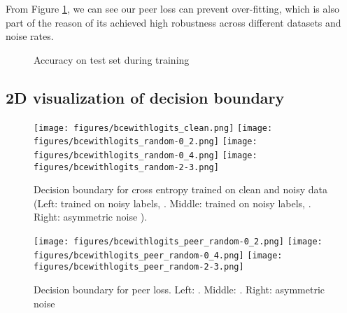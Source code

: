From Figure \ref{fig:test}, we can see our peer loss can prevent over-fitting, which is also part of the reason of its achieved high robustness across different datasets and noise rates.

\begin{figure}
    \centering
    \caption{Accuracy on test set during training}
    \label{fig:test}
\end{figure}


\subsection*{2D visualization of decision boundary}



\begin{figure}[!ht]
\centering
\texttt{[image: figures/bcewithlogits\_clean.png]}\hspace{-0.1in}
\texttt{[image: figures/bcewithlogits\_random-0\_2.png]}\hspace{-0.1in}
\texttt{[image: figures/bcewithlogits\_random-0\_4.png]}\hspace{-0.1in}
\texttt{[image: figures/bcewithlogits\_random-2-3.png]}
\caption{Decision boundary for cross entropy trained on clean and noisy data (Left:  trained on noisy labels, . Middle: trained on noisy labels, . Right: asymmetric noise  ).}\label{CE:db:clean}
\end{figure}

\begin{figure}[!ht]
\centering
\texttt{[image: figures/bcewithlogits\_peer\_random-0\_2.png]}\hspace{-0.15in}
\texttt{[image: figures/bcewithlogits\_peer\_random-0\_4.png]}\hspace{-0.15in}
\texttt{[image: figures/bcewithlogits\_peer\_random-2-3.png]}
\caption{Decision boundary for peer loss. Left: . Middle: . Right: asymmetric noise } \end{figure}


%
